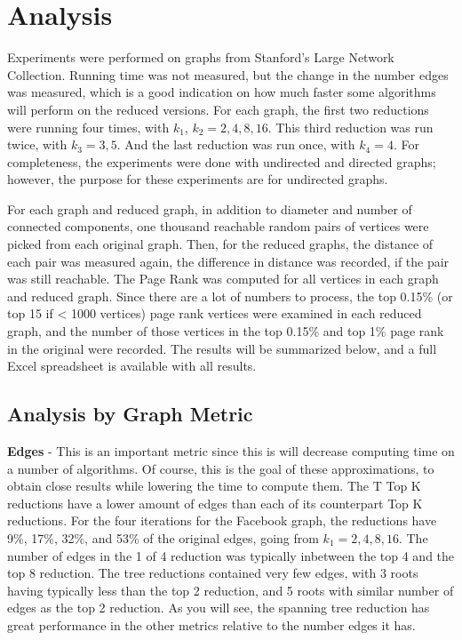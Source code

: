\documentclass[11pt]{article}
\begin{document}
\pagebreak

\section{Analysis}
Experiments were performed on graphs from Stanford's Large Network Collection.  Running time was not measured, but the change in the number edges was measured, which is a good indication on how much faster some algorithms will perform on the reduced versions.  For each graph, the first two reductions were running four times, with $k_1$, $k_2 = 2,4,8,16$.  This third reduction was run twice, with $k_3 = 3,5$.  And the last reduction was run once, with $k_4 = 4$.  For completeness, the experiments were done with undirected and directed graphs; however, the purpose for these experiments are for undirected graphs. 

For each graph and reduced graph, in addition to diameter and number of connected components, one thousand reachable random pairs of vertices were picked from each original graph.  Then, for the reduced graphs, the distance of each pair was measured again, the difference in distance was recorded, if the pair was still reachable.  The Page Rank was computed for all vertices in each graph and reduced graph.  Since there are a lot of numbers to process, the top 0.15\% (or top 15 if < 1000 vertices) page rank vertices were examined in each reduced graph, and the number of those vertices in the top 0.15\% and top 1\% page rank in the original were recorded.  The results will be summarized below, and a full Excel spreadsheet is available with all results.

\subsection{Analysis by Graph Metric}
\textbf{Edges} - This is an important metric since this is will decrease computing time on a number of algorithms.  Of course, this is the goal of these approximations, to obtain close results while lowering the time to compute them.  The T Top K reductions have a lower amount of edges than each of its counterpart Top K reductions. For the four iterations for the Facebook graph, the reductions have 9\%, 17\%, 32\%, and 53\% of the original edges, going from $k_1 = 2, 4, 8, 16$.  The number of edges in the 1 of 4 reduction was typically inbetween the top 4 and the top 8 reduction.  The tree reductions contained very few edges, with 3 roots having typically less than the top 2 reduction, and 5 roots with similar number of edges as the top 2 reduction.  As you will see, the spanning tree reduction has great performance in the other metrics relative to the number edges it has.
\end{document}
